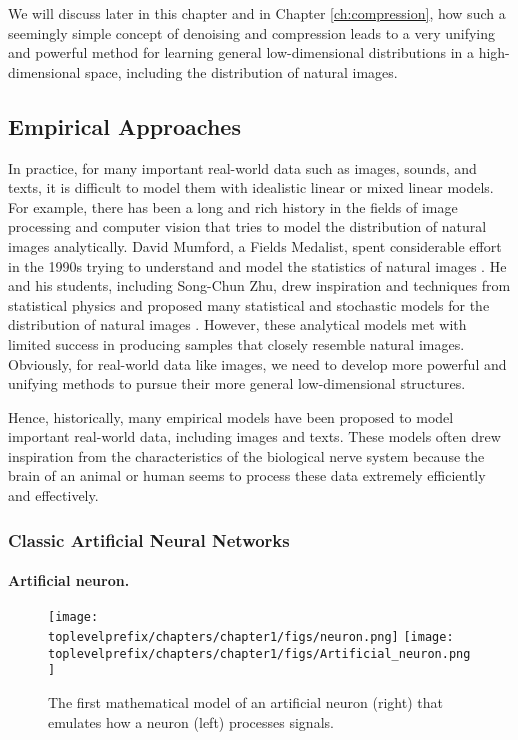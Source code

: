 \documentclass[../../book-main.tex]{subfiles}
\begin{document}
We will discuss later in this chapter and in Chapter \ref{ch:compression}, how such a seemingly simple concept of denoising and compression leads to a very unifying and powerful method for learning general low-dimensional distributions in a high-dimensional space, including the distribution of natural images. 

\subsection{Empirical Approaches}
In practice, for many important real-world data such as images, sounds, and texts, it is difficult to model them with idealistic linear or mixed linear models. For example, there has been a long and rich history in the fields of image processing and computer vision that tries to model the distribution of natural images analytically. David Mumford, a Fields Medalist, spent considerable effort in the 1990s trying to understand and model the statistics of natural images \cite{Mumford1996TheSD}. He and his students, including Song-Chun Zhu, drew inspiration and techniques from statistical physics and proposed many statistical and stochastic models for the distribution of natural images \cite{Zhu-Entropy-1997,Zhu1997LearningGP,Zhu1997Prior,Huang-Mumford,Mumford-1999,Lee-Mumford}. However, these analytical models met with limited success in producing samples that closely resemble natural images. Obviously, for real-world data like images, we need to develop more powerful and unifying methods to pursue their more general low-dimensional structures.

Hence, historically, many empirical models  have been proposed to model important real-world data, including images and texts. These models often drew inspiration from the characteristics of the biological nerve system because the brain of an animal or human seems to process these data extremely efficiently and effectively. 

\subsubsection{Classic Artificial Neural Networks}
\paragraph{Artificial neuron.}

\begin{figure}[t]
    \centering
\texttt{[image: \\toplevelprefix/chapters/chapter1/figs/neuron.png]} \hspace{3mm}   
\texttt{[image: \\toplevelprefix/chapters/chapter1/figs/Artificial\_neuron.png]}
    \caption{The first mathematical model of an artificial neuron (right) that emulates how a neuron (left) processes signals. }
    \label{fig:neuron}
\end{figure}
\end{document}
